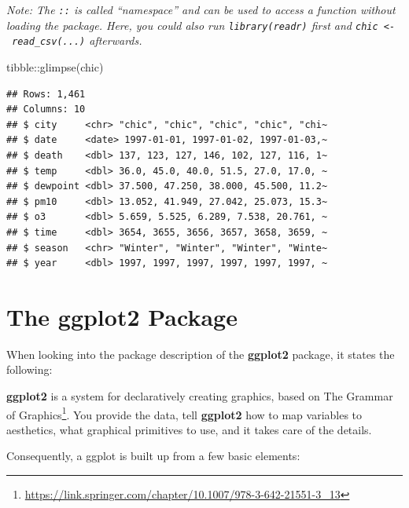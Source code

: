 \documentclass[
]{krantz}
\makeatletter
\newenvironment{Shaded}{\begin{snugshade}}{\end{snugshade}}
\newcommand{\FunctionTok}[1]{\textcolor[rgb]{0,0,0}{#1}}
\newcommand{\NormalTok}[1]{#1}
\newcommand{\SpecialCharTok}[1]{\textcolor[rgb]{0,0,0}{#1}}
\renewenvironment{quote}{\begin{VF}}{\end{VF}}
\renewcommand{\href}[2]{#2\footnote{\url{#1}}}
\newenvironment{kframe}{%
\medskip{}
\setlength{\fboxsep}{.8em}
 \def\at@end@of@kframe{}%
 \ifinner\ifhmode%
  \def\at@end@of@kframe{\end{minipage}}%
  \begin{minipage}{\columnwidth}%
 \fi\fi%
 \def\FrameCommand##1{\hskip\@totalleftmargin \hskip-\fboxsep
 \colorbox{shadecolor}{##1}\hskip-\fboxsep
     \hskip-\linewidth \hskip-\@totalleftmargin \hskip\columnwidth}%
 \MakeFramed {\advance\hsize-\width
   \@totalleftmargin\z@ \linewidth\hsize
   \@setminipage}}%
 {\par\unskip\endMakeFramed%
 \at@end@of@kframe}
\renewenvironment{Shaded}{\begin{kframe}}{\end{kframe}}
\makeatother
\begin{document}
\emph{Note: The \texttt{::} is called ``namespace'' and can be used to access a function without loading the package. Here, you could also run \texttt{library(readr)} first and \texttt{chic\ \textless{}-\ read\_csv(...)} afterwards.}

\begin{Shaded}
\begin{Highlighting}[]
\NormalTok{tibble}\SpecialCharTok{::}\FunctionTok{glimpse}\NormalTok{(chic)}
\end{Highlighting}
\end{Shaded}

\begin{verbatim}
## Rows: 1,461
## Columns: 10
## $ city     <chr> "chic", "chic", "chic", "chic", "chi~
## $ date     <date> 1997-01-01, 1997-01-02, 1997-01-03,~
## $ death    <dbl> 137, 123, 127, 146, 102, 127, 116, 1~
## $ temp     <dbl> 36.0, 45.0, 40.0, 51.5, 27.0, 17.0, ~
## $ dewpoint <dbl> 37.500, 47.250, 38.000, 45.500, 11.2~
## $ pm10     <dbl> 13.052, 41.949, 27.042, 25.073, 15.3~
## $ o3       <dbl> 5.659, 5.525, 6.289, 7.538, 20.761, ~
## $ time     <dbl> 3654, 3655, 3656, 3657, 3658, 3659, ~
## $ season   <chr> "Winter", "Winter", "Winter", "Winte~
## $ year     <dbl> 1997, 1997, 1997, 1997, 1997, 1997, ~
\end{verbatim}

\hypertarget{ggplot}{%
\section{\texorpdfstring{The \textbf{ggplot2} Package}{The ggplot2 Package}}\label{ggplot}}

When looking into the package description of the \textbf{ggplot2} package, it states the following:

\begin{quote}
\textbf{ggplot2} is a system for declaratively creating graphics, based on \href{https://link.springer.com/chapter/10.1007/978-3-642-21551-3_13}{The Grammar of Graphics}. You provide the data, tell \textbf{ggplot2} how to map variables to aesthetics, what graphical primitives to use, and it takes care of the details.
\end{quote}

Consequently, a ggplot is built up from a few basic elements:
\end{document}
